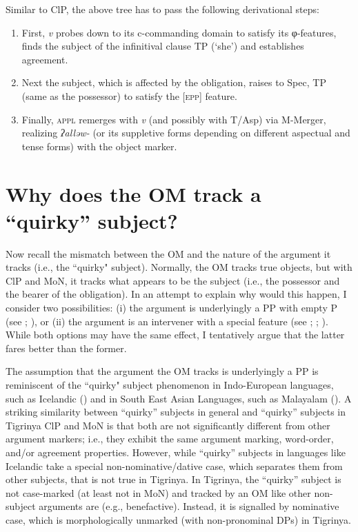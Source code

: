 \documentclass[output=paper]{langscibook}
\begin{document}
Similar to ClP, the above tree has to pass the following derivational steps:

\begin{enumerate}
\item First, \emph{v} probes down to its c-commanding domain to satisfy its φ-features, finds the subject of the infinitival clause TP (`she') and establishes agreement.
\item Next the subject, which is affected by the obligation, raises to Spec, TP (same as the possessor) to satisfy the [{\scshape epp}] feature. 
\item Finally, {\scshape appl} remerges with \emph{v} (and possibly with T/Asp) via M-Merger, realizing \emph{ʔalləw-} (or its suppletive forms depending on different aspectual and tense forms) with the object marker.
\end{enumerate}


\section{Why does the OM track a ``quirky'' subject?}\label{sec:gebregziabher:6}
Now recall the mismatch between the OM and the nature of the argument it tracks (i.e., the ``quirky" subject). Normally, the OM tracks true objects, but with ClP and MoN, it tracks what appears to be the subject (i.e., the possessor and the bearer of the obligation). In an attempt to explain why would this happen, I consider two possibilities: (i) the argument is underlyingly a PP with empty P (see \citealt{landau2010}; \citealt{baker12}), or (ii) the argument is an intervener with a special feature (see \citealt{rezac2008}; \citealt{bejar08}; \citealt{ana17}). While both options may have the same effect, I tentatively argue that the latter fares better than the former.

The assumption that the argument the OM tracks is underlyingly a PP is reminiscent of the ``quirky" subject phenomenon in Indo-European languages, such as Icelandic (\citealt{zaenen1985}) and in South East Asian Languages, such as Malayalam (\citealt{jaya2004}). 
A striking similarity between ``quirky'' subjects in general and ``quirky'' subjects in Tigrinya ClP and MoN is that both are not significantly different from other argument markers; i.e., they exhibit the same argument marking, word-order, and/or agreement properties. However, while ``quirky'' subjects in languages like Icelandic take a special non-nominative/dative case, which separates them from other subjects, that is not true in Tigrinya. In Tigrinya, the ``quirky'' subject is not case-marked (at least not in MoN) and tracked by an OM like other non-subject arguments are (e.g., benefactive). Instead, it is signalled by nominative case, which is morphologically unmarked (with non-pronominal DPs) in Tigrinya. 
\end{document}
